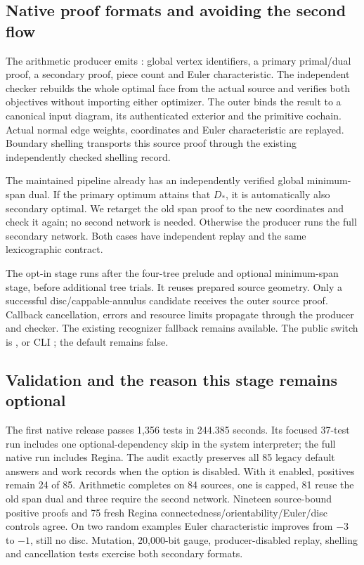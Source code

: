 \subsection{Native proof formats and avoiding the second flow}

\begin{sloppypar}
The arithmetic producer  emits
: global vertex identifiers, a primary
primal/dual proof, a secondary proof, piece count and Euler characteristic.
The independent checker  rebuilds the whole
optimal face from the actual source and verifies both objectives without
importing either optimizer. The outer  binds
the result to a canonical input diagram, its authenticated exterior and
the primitive cochain. Actual normal edge weights, coordinates and Euler
characteristic are replayed. Boundary shelling transports this source proof
through the existing independently checked shelling record.
\end{sloppypar}

The maintained pipeline already has an independently verified global
minimum-span dual. If the primary optimum attains that $D_*$, it is
automatically also secondary optimal. We retarget the old span proof to
the new coordinates and check it again; no second network is needed.
Otherwise the producer runs the full secondary network. Both cases have
independent replay and the same lexicographic contract.

The opt-in stage runs after the four-tree prelude and optional minimum-span
stage, before additional tree trials. It reuses prepared source geometry.
Only a successful disc/cappable-annulus candidate receives the outer source
proof. Callback cancellation, errors and resource limits propagate through
the producer and checker. The existing recognizer fallback remains available.
The public switch is , or CLI
; the default remains false.

\subsection{Validation and the reason this stage remains optional}

The first native release passes 1,356 tests in 244.385 seconds. Its focused
37-test run includes one optional-dependency skip in the system interpreter;
the full native run includes Regina. The audit exactly preserves all 85
legacy default answers and work records when the option is disabled.
With it enabled, positives remain 24 of 85. Arithmetic completes on 84
sources, one is capped, 81 reuse the old span dual and three require the
second network. Nineteen source-bound positive proofs and 75 fresh Regina
connectedness/orientability/Euler/disc controls agree. On two random
examples Euler characteristic improves from $-3$ to $-1$, still no disc.
Mutation, 20,000-bit gauge, producer-disabled replay, shelling and
cancellation tests exercise both secondary formats.

